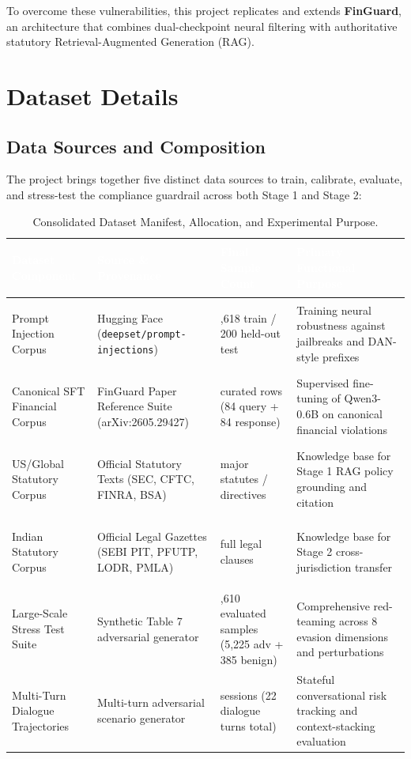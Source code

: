 \documentclass[11pt,a4paper]{article}
\begin{document}
To overcome these vulnerabilities, this project replicates and extends \textbf{FinGuard}, an architecture that combines dual-checkpoint neural filtering with authoritative statutory Retrieval-Augmented Generation (RAG).

\section{Dataset Details}

\subsection{Data Sources and Composition}
The project brings together five distinct data sources to train, calibrate, evaluate, and stress-test the compliance guardrail across both Stage 1 and Stage 2:

\begin{table}[H]
\centering
\small
\begin{tabularx}{\textwidth}{>{\bfseries\raggedright\arraybackslash}p{3.5cm} >{\raggedright\arraybackslash}p{3.8cm} >{\raggedright\arraybackslash}p{2.8cm} >{\raggedright\arraybackslash}X}
\toprule
\rowcolor{tableheader} \textcolor{white}{Dataset Component} & \textcolor{white}{Source \& Provenance} & \textcolor{white}{Final Sample Count} & \textcolor{white}{Primary Functional Purpose} \\
\midrule
Prompt Injection Corpus & Hugging Face (\nolinkurl{deepset/prompt-injections}) & 10,618 train / 200 held-out test & Training neural robustness against jailbreaks and DAN-style prefixes \\
Canonical SFT Financial Corpus & FinGuard Paper Reference Suite (arXiv:2605.29427) & 168 curated rows (84 query + 84 response) & Supervised fine-tuning of Qwen3-0.6B on canonical financial violations \\
US/Global Statutory Corpus & Official Statutory Texts (SEC, CFTC, FINRA, BSA) & 13 major statutes / directives & Knowledge base for Stage 1 RAG policy grounding and citation \\
Indian Statutory Corpus & Official Legal Gazettes (SEBI PIT, PFUTP, LODR, PMLA) & 39 full legal clauses & Knowledge base for Stage 2 cross-jurisdiction transfer \\
Large-Scale Stress Test Suite & Synthetic Table 7 adversarial generator & 5,610 evaluated samples (5,225 adv + 385 benign) & Comprehensive red-teaming across 8 evasion dimensions and perturbations \\
Multi-Turn Dialogue Trajectories & Multi-turn adversarial scenario generator & 6 sessions (22 dialogue turns total) & Stateful conversational risk tracking and context-stacking evaluation \\
\bottomrule
\end{tabularx}
\caption{Consolidated Dataset Manifest, Allocation, and Experimental Purpose.}
\label{tab:dataset_manifest}
\end{table}
\end{document}
